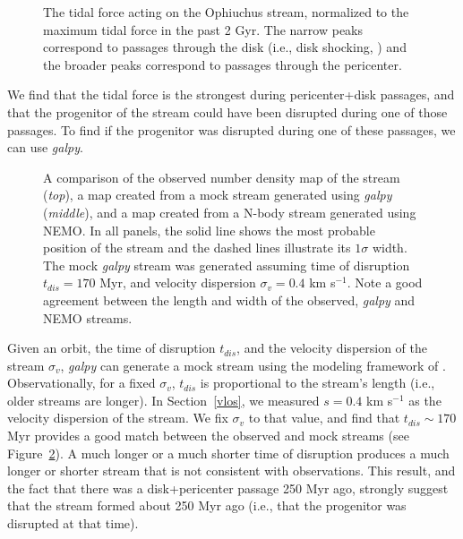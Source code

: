 \documentclass[iop]{emulateapj}
\begin{document}
\begin{figure}
\caption{
The tidal force acting on the Ophiuchus stream, normalized to the maximum tidal
force in the past 2 Gyr. The narrow peaks correspond to passages through the
disk (i.e., disk shocking, \citealt{osc72}) and the broader peaks correspond to
passages through the pericenter.
\label{tidal_force}}
\end{figure}

We find that the tidal force is the strongest during pericenter+disk passages,
and that the progenitor of the stream could have been disrupted during one of
those passages. To find if the progenitor was disrupted during one of these
passages, we can use {\em galpy}.

\begin{figure}


\caption{
A comparison of the observed number density map of the stream ({\em top}), a map
created from a mock stream generated using {\em galpy} ({\em middle}), and a map
created from a N-body stream generated using NEMO. In all panels, the solid line
shows the most probable position of the stream and the dashed lines illustrate
its $1\sigma$ width. The mock {\em galpy} stream was generated assuming time of
disruption $t_{dis}=170$ Myr, and velocity dispersion $\sigma_{v}=0.4$ km
s$^{-1}$. Note a good agreement between the length and width of the observed,
{\em galpy} and NEMO streams.
\label{observed_vs_mock_comparison}}
\end{figure}

Given an orbit, the time of disruption $t_{dis}$, and the velocity dispersion of
the stream $\sigma_v$, {\em galpy} can generate a mock stream using the modeling
framework of \citet{bov14}. Observationally, for a fixed $\sigma_v$, $t_{dis}$
is proportional to the stream's length (i.e., older streams are longer). In
Section~\ref{vlos}, we measured $s=0.4$ km s$^{-1}$ as the velocity dispersion
of the stream. We fix $\sigma_v$ to that value, and find that $t_{dis}\sim170$
Myr provides a good match between the observed and mock streams (see
Figure~\ref{observed_vs_mock_comparison}). A much longer or a much shorter time
of disruption produces a much longer or shorter stream that is not consistent
with observations. This result, and the fact that there was a disk+pericenter
passage 250 Myr ago, strongly suggest that the stream formed about 250 Myr ago
(i.e., that the progenitor was disrupted at that time).
\end{document}
